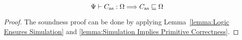 {\begin{theorem}
    \em
    \label{thm:logic soundness}
    \[
        {\Psi} \vdash {C_{\text{as}}} : {\Omega} \Longrightarrow
        C_{\text{as}} \sqsubseteq \Omega
    \]
\end{theorem}
\begin{proof}
    The soundness proof can be done by applying
    Lemma~\ref{lemma:Logic Ensures Simulation} and
    \ref{lemma:Simulation Implies Primitive Correctness}.
\end{proof}
}



